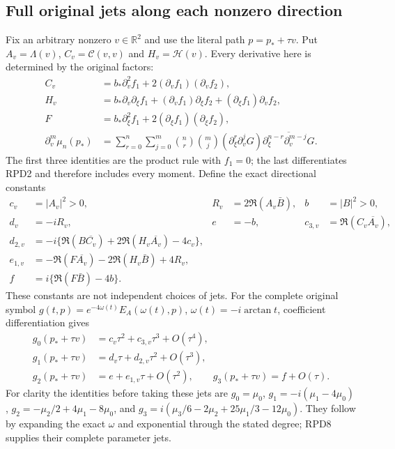 \documentclass[11pt]{article}
\begin{document}
\subsection{Full original jets along each nonzero direction}

Fix an arbitrary nonzero $v\in\mathbb R^2$ and use the literal path
$p=p_*+\tau v$.  Put
$A_v=\Lambda(v)$, $C_v=\mathcal C(v,v)$ and $H_v=\mathcal H(v)$.
Every derivative here is determined by the original factors:
\[
 \begin{aligned}
 C_v&=b_*\partial_v^2f_1+2(\partial_v f_1)(\partial_vf_2),\\
 H_v&=b_*\partial_v\partial_\xi f_1
          +(\partial_vf_1)\partial_\xi f_2
          +(\partial_\xi f_1)\partial_v f_2,\\
 F&=b_*\partial_\xi^2 f_1+2(\partial_\xi f_1)(\partial_\xi f_2),\\
 \partial_v^m\mu_n(p_*)&=\sum_{r=0}^n\sum_{j=0}^m
 \binom nr\binom mj(\partial_\xi^r\partial_v^jG)
       \overline{\partial_\xi^{n-r}\partial_v^{m-j}G}.
 \end{aligned}\tag{RPD8}
\]
The first three identities are the product rule with $f_1=0$;
the last differentiates RPD2 and therefore includes every moment.
Define the exact directional constants
\[
 \begin{aligned}
 c_v&=|A_v|^2>0,& R_v&=2\Re(A_v\bar B),& b&=|B|^2>0,\\
 d_v&=-iR_v,& e&=-b,& c_{3,v}&=\Re(C_v\overline{A_v}),\\
 d_{2,v}&=-i\{\Re(B\overline{C_v})+2\Re(H_v\overline{A_v})-4c_v\},\\
 e_{1,v}&=-\Re(F\overline{A_v})-2\Re(H_v\bar B)+4R_v,\\
 f&=i\{\Re(F\bar B)-4b\}.
 \end{aligned}\tag{RPD9}
\]
These constants are not independent choices of jets.  For the complete
original symbol
$g(t,p)=e^{-4\omega(t)}E_A(\omega(t),p)$,
$\omega(t)=-i\arctan t$, coefficient differentiation gives
\[
 \begin{aligned}
 g_0(p_*+\tau v)&=c_v\tau^2+c_{3,v}\tau^3+O(\tau^4),\\
 g_1(p_*+\tau v)&=d_v\tau+d_{2,v}\tau^2+O(\tau^3),\\
 g_2(p_*+\tau v)&=e+e_{1,v}\tau+O(\tau^2),\qquad
 g_3(p_*+\tau v)=f+O(\tau).
 \end{aligned}\tag{RPD10}
\]
For clarity the identities before taking these jets are
$g_0=\mu_0$, $g_1=-i(\mu_1-4\mu_0)$,
$g_2=-\mu_2/2+4\mu_1-8\mu_0$, and
$g_3=i(\mu_3/6-2\mu_2+25\mu_1/3-12\mu_0)$.
They follow by expanding the exact $\omega$ and exponential through
the stated degree; RPD8 supplies their complete parameter jets.
\end{document}
